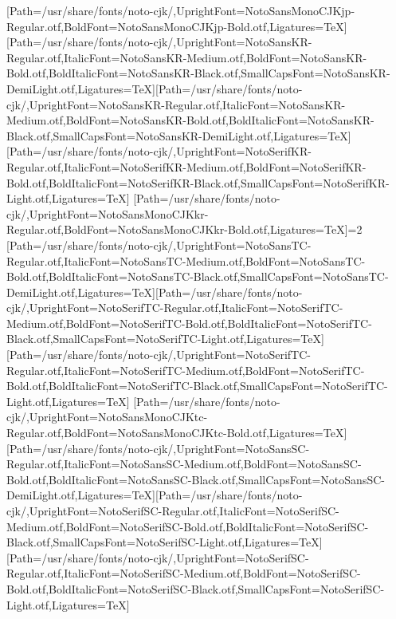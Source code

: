 \newfontfamily{}[Path=/usr/share/fonts/noto-cjk/,UprightFont=NotoSansMonoCJKjp-Regular.otf,BoldFont=NotoSansMonoCJKjp-Bold.otf,Ligatures=TeX]
\newfontfamily{}[Path=/usr/share/fonts/noto-cjk/,UprightFont=NotoSansKR-Regular.otf,ItalicFont=NotoSansKR-Medium.otf,BoldFont=NotoSansKR-Bold.otf,BoldItalicFont=NotoSansKR-Black.otf,SmallCapsFont=NotoSansKR-DemiLight.otf,Ligatures=TeX]\newfontfamily{}[Path=/usr/share/fonts/noto-cjk/,UprightFont=NotoSansKR-Regular.otf,ItalicFont=NotoSansKR-Medium.otf,BoldFont=NotoSansKR-Bold.otf,BoldItalicFont=NotoSansKR-Black.otf,SmallCapsFont=NotoSansKR-DemiLight.otf,Ligatures=TeX]
\newfontfamily{}[Path=/usr/share/fonts/noto-cjk/,UprightFont=NotoSerifKR-Regular.otf,ItalicFont=NotoSerifKR-Medium.otf,BoldFont=NotoSerifKR-Bold.otf,BoldItalicFont=NotoSerifKR-Black.otf,SmallCapsFont=NotoSerifKR-Light.otf,Ligatures=TeX]
\newfontfamily{}[Path=/usr/share/fonts/noto-cjk/,UprightFont=NotoSansMonoCJKkr-Regular.otf,BoldFont=NotoSansMonoCJKkr-Bold.otf,Ligatures=TeX]\else\ifnum\value{NotoCJKFamily}=2
\newfontfamily{}[Path=/usr/share/fonts/noto-cjk/,UprightFont=NotoSansTC-Regular.otf,ItalicFont=NotoSansTC-Medium.otf,BoldFont=NotoSansTC-Bold.otf,BoldItalicFont=NotoSansTC-Black.otf,SmallCapsFont=NotoSansTC-DemiLight.otf,Ligatures=TeX]\newfontfamily{}[Path=/usr/share/fonts/noto-cjk/,UprightFont=NotoSerifTC-Regular.otf,ItalicFont=NotoSerifTC-Medium.otf,BoldFont=NotoSerifTC-Bold.otf,BoldItalicFont=NotoSerifTC-Black.otf,SmallCapsFont=NotoSerifTC-Light.otf,Ligatures=TeX]
\newfontfamily{}[Path=/usr/share/fonts/noto-cjk/,UprightFont=NotoSerifTC-Regular.otf,ItalicFont=NotoSerifTC-Medium.otf,BoldFont=NotoSerifTC-Bold.otf,BoldItalicFont=NotoSerifTC-Black.otf,SmallCapsFont=NotoSerifTC-Light.otf,Ligatures=TeX]
\newfontfamily{}[Path=/usr/share/fonts/noto-cjk/,UprightFont=NotoSansMonoCJKtc-Regular.otf,BoldFont=NotoSansMonoCJKtc-Bold.otf,Ligatures=TeX]
\newfontfamily{}[Path=/usr/share/fonts/noto-cjk/,UprightFont=NotoSansSC-Regular.otf,ItalicFont=NotoSansSC-Medium.otf,BoldFont=NotoSansSC-Bold.otf,BoldItalicFont=NotoSansSC-Black.otf,SmallCapsFont=NotoSansSC-DemiLight.otf,Ligatures=TeX]\newfontfamily{}[Path=/usr/share/fonts/noto-cjk/,UprightFont=NotoSerifSC-Regular.otf,ItalicFont=NotoSerifSC-Medium.otf,BoldFont=NotoSerifSC-Bold.otf,BoldItalicFont=NotoSerifSC-Black.otf,SmallCapsFont=NotoSerifSC-Light.otf,Ligatures=TeX]
\newfontfamily{}[Path=/usr/share/fonts/noto-cjk/,UprightFont=NotoSerifSC-Regular.otf,ItalicFont=NotoSerifSC-Medium.otf,BoldFont=NotoSerifSC-Bold.otf,BoldItalicFont=NotoSerifSC-Black.otf,SmallCapsFont=NotoSerifSC-Light.otf,Ligatures=TeX]
